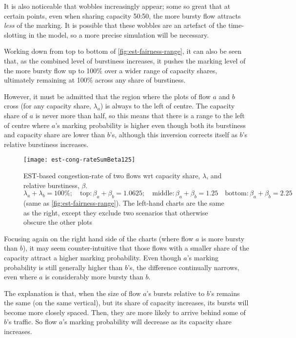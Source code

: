 It is also noticeable that wobbles increasingly appear; some so great that at certain points, even when sharing capacity 50:50, the more bursty flow attracts \emph{less} of the marking. It is possible that these wobbles are an artefact of the time-slotting in the model, so a more precise simulation will be necessary.

Working down from top to bottom of \autoref{fig:est-fairness-range}, it can also be seen that, as the combined level of burstiness increases, it pushes the marking level of the more bursty flow up to 100\% over a wider range of capacity shares, ultimately remaining at 100\% across any share of burstiness.

However, it must be admitted that the region where the plots of flow \(a\) and \(b\) cross (for any capacity share, \(\lambda_a\)) is always to the left of centre. The capacity share of \(a\) is never more than half, so this means that there is a range to the left of centre where \(a\)'s marking probability is higher even though both its burstiness and capacity share are lower than \(b\)'s, although this inversion corrects itself as \(b\)'s relative burstiness increases.

\begin{figure*}[t!]
	\centering
	\texttt{[image: est-cong-rateSumBeta125]}
	\caption{EST-based congestion-rate of two flows wrt capacity share, \(\lambda\), and relative burstiness, \(\beta\).\\
		\(\lambda_a+\lambda_b=100\%; \quad\mathrm{top:} \beta_a+\beta_b=1.0625; \quad\mathrm{middle:} \beta_a+\beta_b=1.25 
		\quad\mathrm{bottom:} \beta_a+\beta_b=2.25\) (same as \autoref{fig:est-fairness-range}). 
		The left-hand charts are the same as the right, except they exclude two scenarios that otherwise obscure the other plots}\label{fig:cong-rate-range}
\end{figure*}

Focusing again on the right hand side of the charts (where flow \(a\) is more bursty than \(b\)), it may seem counter-intuitive that those flows with a smaller share of the capacity attract a higher marking probability. Even though \(a\)'s marking probability is still generally higher than \(b\)'s, the difference continually narrows, even where \(a\) is considerably more bursty than \(b\).

The explanation is that, when the size of flow \(a\)'s bursts relative to \(b\)'s remains the same (on the same vertical), but its share of capacity increases, its bursts will become more closely spaced. Then, they are more likely to arrive behind some of \(b\)'s traffic. So flow \(a\)'s marking probability will decrease as its capacity share increases.

